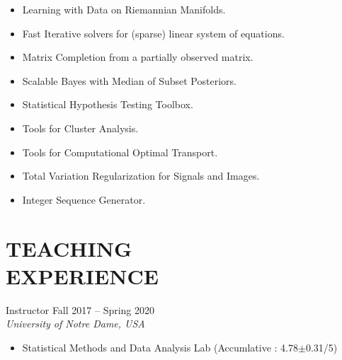 \documentclass[margin, 10pt]{res} %
\begin{document}
\begin{resume}
\begin{itemize}
    \item{ Learning with Data on Riemannian Manifolds.}
    \item{ Fast Iterative solvers for (sparse) linear system of equations.}
    \item{ Matrix Completion from a partially observed matrix.}
    \item{ Scalable Bayes with Median of Subset Posteriors.}
    \item{  Statistical Hypothesis Testing Toolbox.}
    \item{  Tools for Cluster Analysis.}
    \item{  Tools for Computational Optimal Transport.}
    \item{ Total Variation Regularization for Signals and Images.}
    \item{  Integer Sequence Generator.}
\end{itemize}
\vspace{.2cm}



 
\section{\sf TEACHING\\ EXPERIENCE}

Instructor \hfill Fall 2017 -- Spring 2020 \\
{\sl University of Notre Dame, USA}
\begin{itemize} \itemsep -2pt
	\item Statistical Methods and Data Analysis Lab (Accumlative : 4.78$\pm$0.31/5)
\end{itemize}


\end{resume}
\end{document}
